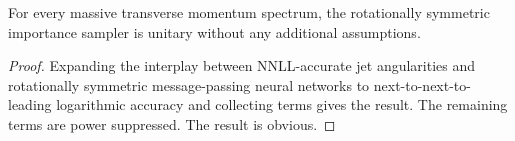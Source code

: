 \begin{lemma}\label{thm:1}
For every massive transverse momentum spectrum, the rotationally
symmetric importance sampler is unitary without any additional
assumptions.
\end{lemma}

\begin{proof}
Expanding the interplay between NNLL-accurate jet angularities and
rotationally symmetric message-passing neural networks to
next-to-next-to-leading logarithmic accuracy and collecting terms gives
the result. The remaining terms are power suppressed. The result is
obvious.
\end{proof}

